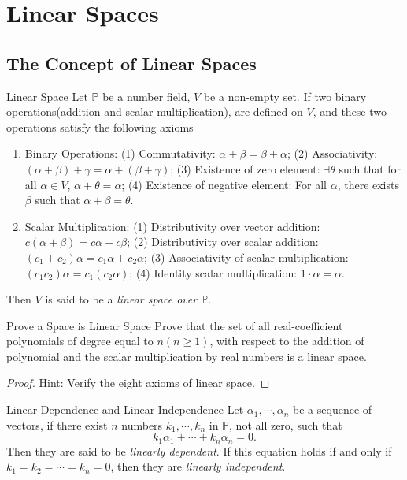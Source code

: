 
\section{Linear Spaces}

\subsection{The Concept of Linear Spaces}

\begin{definition}{Linear Space}{}
  Let $\mathbb{P}$ be a number field, $V$ be a non-empty set.
  If two binary operations(addition and scalar multiplication),
  are defined on $V$, and these two operations satisfy the following axioms
  \begin{enumerate}
  \item Binary Operations:
    (1) Commutativity: $\alpha + \beta = \beta + \alpha$;
    (2) Associativity: $(\alpha + \beta) + \gamma = \alpha + (\beta + \gamma)$;
    (3) Existence of zero element: $\exists \theta$ such that for all $\alpha
    \in V$, $\alpha + \theta = \alpha$;
    (4) Existence of negative element: For all $\alpha$, there exists $\beta$ such that $\alpha + \beta
    = \theta$.
  \item Scalar Multiplication:
    (1) Distributivity over vector addition: $c(\alpha + \beta) = c\alpha + c\beta$;
    (2) Distributivity over scalar addition: $(c_1 + c_2)\alpha = c_1 \alpha +
    c_2 \alpha$;
    (3) Associativity of scalar multiplication: $(c_1c_2)\alpha = c_1(c_2\alpha)$;
    (4) Identity scalar multiplication: $1 \cdot \alpha = \alpha$.
  \end{enumerate}
  Then $V$ is said to be a \emph{linear space over $\mathbb{P}$}.
\end{definition}

\begin{example}{Prove a Space is Linear Space}{}
  Prove that the set of all real-coefficient polynomials of degree equal to $n
  (n \geq 1)$, with respect to the addition of polynomial and the scalar multiplication
  by real numbers is a linear space.
\end{example}

\begin{proof}
  Hint: Verify the eight axioms of linear space.
\end{proof}

\begin{definition}{Linear Dependence and Linear Independence}{}
  Let $\alpha_1, \cdots, \alpha_n$ be a sequence of vectors,
  if there exist $n$ numbers $k_1, \cdots, k_n$ in $\mathbb{P}$, not all zero, such that
  \begin{equation}
    k_1 \alpha_1 + \cdots + k_n \alpha_n = 0.
  \end{equation}
  Then they are said to be \emph{linearly dependent}.
  If this equation holds if and only if $k_1 = k_2 = \cdots = k_n = 0$,
  then they are \emph{linearly independent}.
\end{definition}

